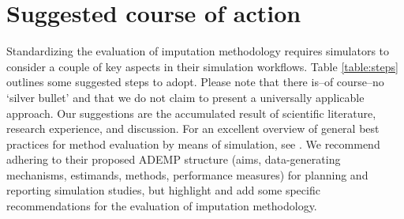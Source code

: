 \documentclass[bimj,fleqn]{w-art}
\begin{document}


\section{Suggested course of action}

Standardizing the evaluation of imputation methodology requires simulators to consider a couple of key aspects in their simulation workflows. Table \ref{table:steps} outlines some suggested steps to adopt. Please note that there is--of course--no `silver bullet' and that we do not claim to present a universally applicable approach. Our suggestions are the accumulated result of scientific literature, research experience, and discussion. For an excellent overview of general best practices for method evaluation by means of simulation, see \citet{morr18}. We recommend adhering to their proposed ADEMP structure (aims, data-generating mechanisms, estimands, methods, performance measures) for planning and reporting simulation studies, but highlight and add some specific recommendations for the evaluation of imputation methodology.
\end{document}
